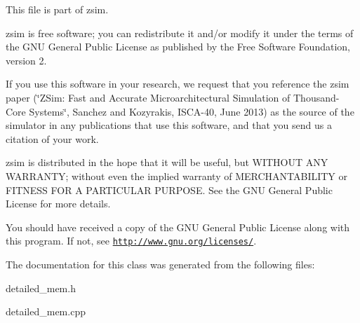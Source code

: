 This file is part of zsim.

zsim is free software; you can redistribute it and/or modify it under the terms of the G\-N\-U General Public License as published by the Free Software Foundation, version 2.

If you use this software in your research, we request that you reference the zsim paper (\char`\"{}\-Z\-Sim\-: Fast and Accurate Microarchitectural Simulation of
\-Thousand-\/\-Core Systems\char`\"{}, Sanchez and Kozyrakis, I\-S\-C\-A-\/40, June 2013) as the source of the simulator in any publications that use this software, and that you send us a citation of your work.

zsim is distributed in the hope that it will be useful, but W\-I\-T\-H\-O\-U\-T A\-N\-Y W\-A\-R\-R\-A\-N\-T\-Y; without even the implied warranty of M\-E\-R\-C\-H\-A\-N\-T\-A\-B\-I\-L\-I\-T\-Y or F\-I\-T\-N\-E\-S\-S F\-O\-R A P\-A\-R\-T\-I\-C\-U\-L\-A\-R P\-U\-R\-P\-O\-S\-E. See the G\-N\-U General Public License for more details.

You should have received a copy of the G\-N\-U General Public License along with this program. If not, see \href{http://www.gnu.org/licenses/}{\tt http\-://www.\-gnu.\-org/licenses/}. 

The documentation for this class was generated from the following files\-:\begin{DoxyCompactItemize}
\item 
detailed\-\_\-mem.\-h\item 
detailed\-\_\-mem.\-cpp\end{DoxyCompactItemize}
